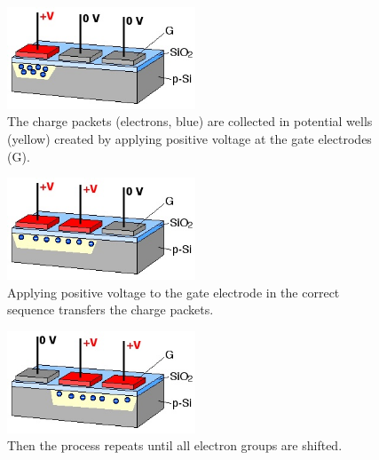 \documentclass{loyola-beamer}
\begin{document}
\begin{frame}
	\begin{figure}
		\begin{center}
			\includegraphics[width=0.5\textwidth]{./figures/1.jpeg}
		\end{center}
		\caption{The charge packets (electrons, blue) are collected in potential wells (yellow) created by applying positive voltage at the gate electrodes (G).}
	\end{figure}
\end{frame}

\begin{frame}
	\begin{figure}
		\begin{center}
			\includegraphics[width=0.5\textwidth]{./figures/2.jpeg}
		\end{center}
		\caption{Applying positive voltage to the gate electrode in the correct sequence transfers the charge packets.}
	\end{figure}
\end{frame}

\begin{frame}
	\begin{figure}
		\begin{center}
			\includegraphics[width=0.5\textwidth]{./figures/3.jpeg}
		\end{center}
		\caption{Then the process repeats until all electron groups are shifted.}
	\end{figure}
\end{frame}
\end{document}
